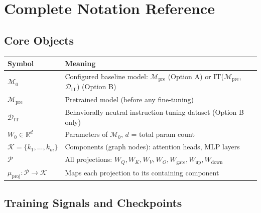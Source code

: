 \documentclass[11pt]{article}
\begin{document}
\section{Complete Notation Reference}
\label{app:notation}

\subsection{Core Objects}

\begin{center}
\begin{tabular}{ll}
\toprule
\textbf{Symbol} & \textbf{Meaning} \\
\midrule
$\mathcal{M}_0$ & Configured baseline model: $\mathcal{M}_{\text{pre}}$ (Option A) or IT($\mathcal{M}_{\text{pre}}$, $\mathcal{D}_{\text{IT}}$) (Option B) \\
$\mathcal{M}_{\text{pre}}$ & Pretrained model (before any fine-tuning) \\
$\mathcal{D}_{\text{IT}}$ & Behaviorally neutral instruction-tuning dataset (Option B only) \\
$W_0 \in \mathbb{R}^d$ & Parameters of $\mathcal{M}_0$, $d$ = total param count \\
$\mathcal{K} = \{k_1, \ldots, k_m\}$ & Components (graph nodes): attention heads, MLP layers \\
$\mathcal{P}$ & All projections: $W_Q, W_K, W_V, W_O, W_{\text{gate}}, W_{\text{up}}, W_{\text{down}}$ \\
$\mu_{\text{proj}}: \mathcal{P} \to \mathcal{K}$ & Maps each projection to its containing component \\
\bottomrule
\end{tabular}
\end{center}

\subsection{Training Signals and Checkpoints}
\end{document}

